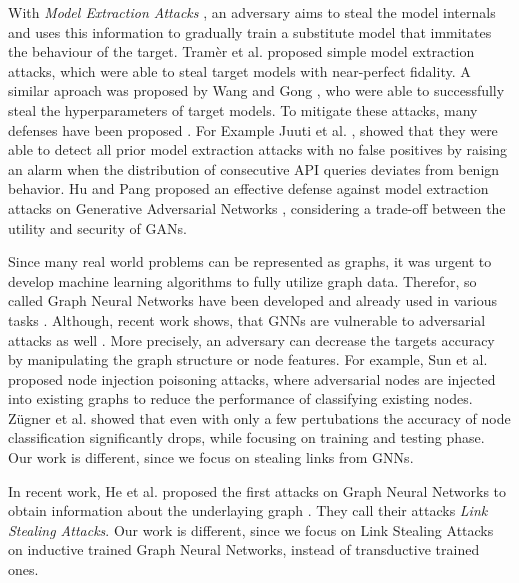   With \emph{Model Extraction Attacks} \cite{atli2020extraction, juuti2019prada, tramer2016stealing}, an adversary aims to steal the model internals and uses this information to gradually train a substitute model that immitates the behaviour of the target.
  Tramèr et al. \cite{tramer2016stealing} proposed simple model extraction attacks, which were able to steal target models with near-perfect fidality.
  A similar aproach was proposed by Wang and Gong \cite{8418595}, who were able to successfully steal the hyperparameters of target models.
  To mitigate these attacks, many defenses have been proposed \cite{juuti2019prada, hu2021model, 272262, mori2021bodame}.
  For Example Juuti et al. \cite{juuti2019prada}, showed that they were able to detect all prior model extraction attacks with no false positives by raising an alarm when the distribution of consecutive API queries deviates from benign behavior.
  Hu and Pang \cite{hu2021model} proposed an effective defense against model extraction attacks on Generative Adversarial Networks \cite{goodfellow2014generative}, considering a trade-off between the utility and security of GANs.

  Since many real world problems can be represented as graphs, it was urgent to develop machine learning algorithms to fully utilize graph data.
  Therefor, so called Graph Neural Networks have been developed and already used in various tasks \cite{4700287, atwood2016diffusionconvolutional, kipf2017semisupervised, velickovic2018graph}.
  Although, recent work shows, that GNNs are vulnerable to adversarial attacks as well \cite{agbcvmtgs, 10.1145/3366423.3380149, Z_gner_2018, 10.1145/3219819.3220078, jin2020adversarial}.
  More precisely, an adversary can decrease the targets accuracy by manipulating the graph structure or node features.
  For example, Sun et al. \cite{10.1145/3366423.3380149} proposed node injection poisoning attacks, where adversarial nodes are injected into existing graphs to reduce the performance of classifying existing nodes.
  Zügner et al. \cite{10.1145/3219819.3220078} showed that even with only a few pertubations the accuracy of node classification significantly drops, while focusing on training and testing phase.
  Our work is different, since we focus on stealing links from GNNs.




  In recent work, He et al. proposed the first attacks on Graph Neural Networks to obtain information about the underlaying graph \cite{DBLP:journals/corr/abs-2005-02131}. They call their attacks \emph{Link Stealing Attacks}.
  Our work is different, since we focus on Link Stealing Attacks on inductive trained Graph Neural Networks, instead of transductive trained ones.

